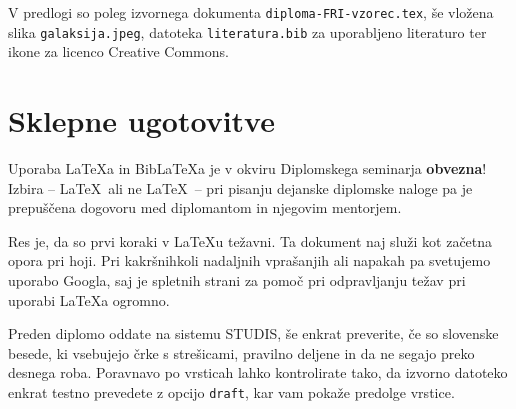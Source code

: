 \documentclass[a4paper,12pt,openright]{book}
\newcommand{\BibLaTeX}{{\sc Bib}\LaTeX}
\begin{document}
V predlogi so poleg izvornega  dokumenta \texttt{diploma-FRI-vzorec.tex}, še vložena slika \texttt{galaksija.jpeg}, datoteka \texttt{literatura.bib} za uporabljeno literaturo  ter
ikone za licenco Creative Commons.


\chapter{Sklepne ugotovitve}

Uporaba \LaTeX{a} in \BibLaTeX{a} je v okviru Diplomskega seminarja \textbf{obvezna}!
Izbira -- \LaTeX\ ali ne \LaTeX\ -- pri pisanju dejanske diplomske naloge pa je pre\-pu\-šče\-na dogovoru med diplomantom in njegovim mentorjem.

Res je, da so prvi koraki v \LaTeX{}u težavni. 
Ta dokument naj služi kot začetna opora pri hoji.
Pri kakršnihkoli nadaljnih vprašanjih ali napakah pa svetujemo uporabo Googla, saj je spletnih strani za pomoč pri odpravljanju težav pri uporabi \LaTeX{}a ogromno.

Preden diplomo oddate na sistemu STUDIS, še enkrat preverite, če so slovenske besede, ki vsebujejo črke s strešicami,  pravilno deljene in da ne segajo preko desnega roba.
Poravnavo po vrsticah lahko kontrolirate tako, da izvorno datoteko enkrat testno prevedete z opcijo \texttt{draft}, kar vam pokaže  predolge vrstice.






\printbibliography[heading=bibintoc,type=article,title={Članki v revijah}]

\printbibliography[heading=bibintoc,type=inproceedings,title={Članki v zbornikih}]

\printbibliography[heading=bibintoc,type=incollection,title={Poglavja v knjigah}]

\printbibliography[heading=bibintoc,title={Celotna literatura}]
\end{document}
